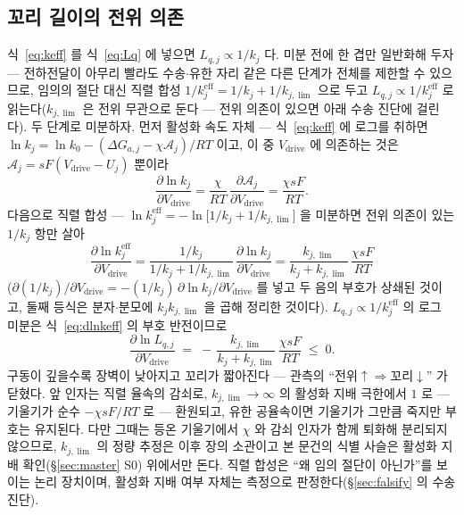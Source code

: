 \documentclass[11pt,a4paper]{article}
\newcommand{\eff}{\mathrm{eff}}
\newcommand{\drive}{\mathrm{drive}}
\begin{document}
\subsection{꼬리 길이의 전위 의존}
식~\eqref{eq:keff} 를 식~\eqref{eq:Lq} 에 넣으면 $L_{q,j}\propto1/k_j$ 다. 미분 전에 한 겹만
일반화해 두자 — 전하전달이 아무리 빨라도 수송$\cdot$유한 자리 같은 다른 단계가 전체를 제한할 수
있으므로, 임의의 절단 대신 직렬 합성 $1/k_j^{\eff}=1/k_j+1/k_{j,\lim}$ 으로 두고
$L_{q,j}\propto1/k_j^{\eff}$ 로 읽는다($k_{j,\lim}$ 은 전위 무관으로 둔다 — 전위 의존이 있으면 아래
수송 진단에 걸린다). 두 단계로 미분하자. 먼저 활성화 속도 자체 — 식~\eqref{eq:keff} 에 로그를 취하면
$\ln k_j=\ln k_0-(\Delta G_{a,j}-\chi\mathcal A_j)/RT$ 이고, 이 중 $V_\drive$ 에 의존하는 것은
$\mathcal A_j=sF(V_\drive-U_j)$ 뿐이라
\begin{equation}
\frac{\partial\ln k_j}{\partial V_\drive}
=\frac{\chi}{RT}\,\frac{\partial\mathcal A_j}{\partial V_\drive}
=\frac{\chi sF}{RT}.
\label{eq:dlnk}
\end{equation}
다음으로 직렬 합성 — $\ln k_j^{\eff}=-\ln\big[1/k_j+1/k_{j,\lim}\big]$ 을 미분하면 전위 의존이
있는 $1/k_j$ 항만 살아
\begin{equation}
\frac{\partial\ln k_j^{\eff}}{\partial V_\drive}
=\frac{1/k_j}{1/k_j+1/k_{j,\lim}}\,\frac{\partial\ln k_j}{\partial V_\drive}
=\frac{k_{j,\lim}}{k_j+k_{j,\lim}}\,\frac{\chi sF}{RT}
\label{eq:dlnkeff}
\end{equation}
($\partial(1/k_j)/\partial V_\drive=-(1/k_j)\,\partial\ln k_j/\partial V_\drive$ 를 넣고 두 음의
부호가 상쇄된 것이고, 둘째 등식은 분자$\cdot$분모에 $k_jk_{j,\lim}$ 을 곱해 정리한 것이다).
$L_{q,j}\propto1/k_j^{\eff}$ 의 로그 미분은 식~\eqref{eq:dlnkeff} 의 부호 반전이므로
\begin{equation}
\frac{\partial\ln L_{q,j}}{\partial V_\drive}
\;=\;-\,\frac{k_{j,\lim}}{k_j+k_{j,\lim}}\,\frac{\chi sF}{RT}\;\le\;0.
\label{eq:LqV}
\end{equation}
구동이 깊을수록 장벽이 낮아지고 꼬리가 짧아진다 — 관측의 ``전위$\uparrow\Rightarrow$꼬리$\downarrow$''
가 닫혔다. 앞 인자는 직렬 율속의 감쇠로, $k_{j,\lim}\to\infty$ 의 활성화 지배 극한에서 $1$ 로 —
기울기가 순수 $-\chi sF/RT$ 로 — 환원되고, 유한 공율속이면 기울기가 그만큼 죽지만 부호는 유지된다.
다만 그때는 등온 기울기에서 $\chi$ 와 감쇠 인자가 함께 퇴화해 분리되지 않으므로, $k_{j,\lim}$ 의
정량 추정은 이후 장의 소관이고 본 문건의 식별 사슬은 활성화 지배 확인(\S\ref{sec:master} S0)
위에서만 돈다. 직렬 합성은 ``왜 임의 절단이 아닌가''를 보이는 논리 장치이며, 활성화 지배 여부 자체는
측정으로 판정한다(\S\ref{sec:falsify} 의 수송 진단).
\end{document}
